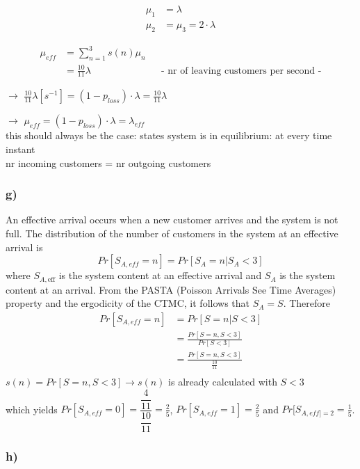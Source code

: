 \begin{align*}
\mu _{1}&=\lambda \\
\mu _{2}&=\mu _{3}=2\cdot \lambda 
\end{align*}

\begin{align*}
\mu _{{eff}}&=\sum _{{n=1}}^{3}s\left(n\right)\mu _{n}\\
&=\frac{10}{11}\lambda && \text{-  nr of leaving customers per second -}
\end{align*}

$\rightarrow$ $\frac{10}{11}\lambda \left[s^{{-1}}\right]=\left(1-p_{loss}\right)\cdot \lambda =\frac{10}{11}\lambda $

$\rightarrow$ $\mu _{eff}=\left(1-p_{loss}\right)\cdot \lambda =\lambda _{eff}$\\
this should always be the case: states system is in equilibrium:
at every time instant\\
nr incoming customers = nr outgoing customers

\subsubsection*{ g) }

An effective arrival occurs when a new customer arrives and the system is not full.
    The distribution of the number of customers in the system at an effective arrival is
    \[
        Pr[S_{A,eff} = n] = Pr[S_A = n | S_A < 3]
    \]
    where $S_{A,\text{eff}}$ is the system content at an effective arrival and $S_A$ is the system content at an arrival.
    From the PASTA (Poisson Arrivals See Time Averages) property and the ergodicity of the CTMC, it follows that $S_A = S$.
    Therefore
    \begin{align*}
        Pr[S_{A,eff} = n]
        &= Pr[S = n | S < 3]\\
        &= \frac{Pr[S = n, S < 3]}{Pr[S < 3]}\\
        &= \frac{Pr[S = n, S < 3]}{\frac{10}{11}}\\
    \end{align*}
    $s(n) = Pr[S = n, S < 3] \rightarrow s(n)$ is already calculated with $S < 3$\\
    which yields $Pr[S_{A,eff} = 0] = \dfrac{\dfrac{4}{11}}{\dfrac{10}{11}} = \frac{2}{5}$, $Pr[S_{A,eff} = 1] = \frac{2}{5}$ and $Pr[S_{A,eff] = 2} = \frac{1}{5}$.


\subsubsection*{ h) }

